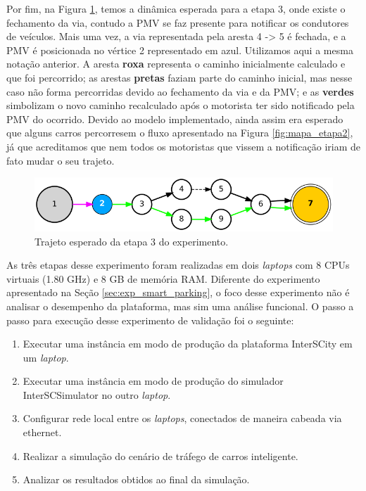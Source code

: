 Por fim, na Figura \ref{fig:mapa_etapa3}, temos a dinâmica esperada para a etapa 3, onde existe o fechamento da via, contudo a PMV se faz presente para notificar os condutores de veículos.
Mais uma vez, a via representada pela aresta 4 -> 5 é fechada, e a PMV é posicionada no vértice 2 representado em azul.
Utilizamos aqui a mesma notação anterior.
A aresta \textbf{roxa} representa o caminho inicialmente calculado e que foi percorrido;
as arestas \textbf{pretas} faziam parte do caminho inicial, mas nesse caso não forma percorridas devido ao fechamento da via e da PMV;
e as \textbf{verdes} simbolizam o novo caminho recalculado após o motorista ter sido notificado pela PMV do ocorrido.
Devido ao modelo implementado, ainda assim era esperado que alguns carros percorresem o fluxo apresentado na Figura \ref{fig:mapa_etapa2}, já que acreditamos que nem todos os motoristas que vissem
a notificação iriam de fato mudar o seu trajeto.

\begin{figure}[ht]
	\centering
	\includegraphics[width=\textwidth]{figuras/mapa_etapa3.png}
	\caption{Trajeto esperado da etapa 3 do experimento.}
	\label{fig:mapa_etapa3}
\end{figure}

As três etapas desse experimento foram realizadas em dois \textit{laptops} com 8 CPUs virtuais (1.80 GHz) e 8 GB de memória RAM.
Diferente do experimento apresentado na Seção \ref{sec:exp_smart_parking}, o foco desse experimento não é analisar o desempenho da plataforma, mas sim uma análise funcional. 
O passo a passo para execução desse experimento de validação foi o seguinte:

\begin{enumerate}
    \item Executar uma instância em modo de produção da plataforma InterSCity em um \textit{laptop}.

    \item Executar uma instância em modo de produção do simulador InterSCSimulator no outro \textit{laptop}.

    \item Configurar rede local entre os \textit{laptops}, conectados de maneira cabeada via ethernet.

    \item Realizar a simulação do cenário de tráfego de carros inteligente.

    \item Analizar os resultados obtidos ao final da simulação.
\end{enumerate}

